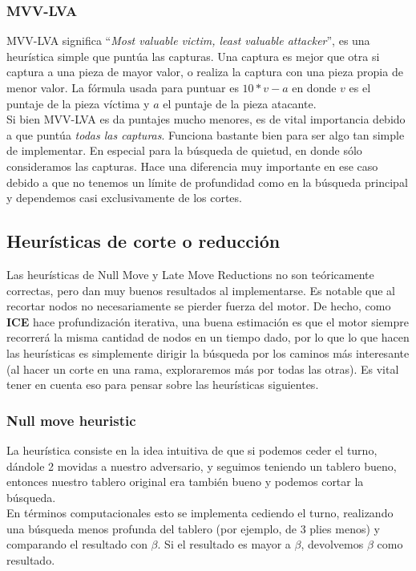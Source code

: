 \documentclass{article}
\newcommand{\ICE}[0]{{\bf ICE}}
\begin{document}
\begin{multicols}{2}
\subsubsection{MVV-LVA}
MVV-LVA significa ``\emph{Most valuable victim, least valuable
attacker}'', es una heurística simple que puntúa las capturas. Una
captura es mejor que otra si captura a una pieza de mayor valor, o
realiza la captura con una pieza propia de menor valor. La fórmula
usada para puntuar es $10*v - a$ en donde $v$ es el puntaje de la pieza
víctima y $a$ el puntaje de la pieza atacante.
\\

Si bien MVV-LVA es da puntajes mucho menores, es de vital importancia
debido a que puntúa \emph{todas las capturas}. Funciona bastante
bien para ser algo tan simple de implementar. En especial para la
búsqueda de quietud, en donde sólo consideramos las capturas. Hace
una diferencia muy importante en ese caso debido a que no tenemos un
límite de profundidad como en la búsqueda principal y dependemos casi
exclusivamente de los cortes.

\subsection{Heurísticas de corte o reducción}

Las heurísticas de Null Move y Late Move Reductions no son
teóricamente correctas, pero dan muy buenos resultados al
implementarse. Es notable que al recortar nodos no necesariamente se
pierder fuerza del motor. De hecho, como \ICE{} hace profundización
iterativa, una buena estimación es que el motor siempre recorrerá
la misma cantidad de nodos en un tiempo dado, por lo que lo que hacen
las heurísticas es simplemente dirigir la búsqueda por los caminos
más interesante (al hacer un corte en una rama, exploraremos más por
todas las otras). Es vital tener en cuenta eso para pensar sobre las
heurísticas siguientes.

\subsubsection{Null move heuristic}
La heurística consiste en la idea intuitiva de que si podemos ceder el
turno, dándole 2 movidas a nuestro adversario, y seguimos teniendo un
tablero bueno, entonces nuestro tablero original era también bueno y
podemos cortar la búsqueda.
\\

En términos computacionales esto se implementa cediendo el turno,
realizando una búsqueda menos profunda del tablero (por ejemplo, de 3
plies menos) y comparando el resultado con $\beta$. Si el resultado es
mayor a $\beta$, devolvemos $\beta$ como resultado.
\\


\end{multicols}
\end{document}
